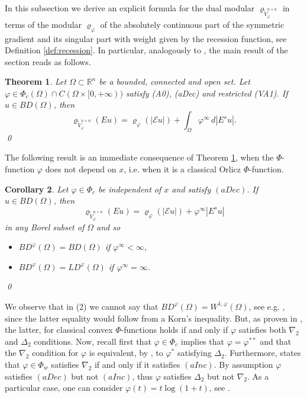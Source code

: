 \documentclass[a4paper,11pt,oneside,notitlepage]{article}
\newtheorem{theorem}{Theorem}[section]
\newtheorem{corollary}[theorem]{Corollary}
\numberwithin{equation}{section}
\def\R{\mathbb{R}}
\newcommand{\vphi}{\varphi}
\newcommand{\vrho}{\varrho}
\newcommand{\E}{\mathcal{E}}
\begin{document}
In this subsection we derive an explicit formula for the dual modular $\vrho_{\widetilde{V}^{n \times n}_\vphi}$ in terms of the modular $\vrho_\vphi$ of the absolutely continuous part of the symmetric gradient and its singular part with weight given by the recession function, see Definition \ref{def:recession}. In particular, analogously to \cite[Theorem 6.4]{EHH}, the main result of the section reads as follows.

\begin{theorem}
\label{thm:exactFormula}
    Let $\Omega \subset \R^n$ be a bounded, connected and open set. Let $\vphi \in \Phi_c(\Omega) \cap C(\Omega \times [0,+\infty))$ satisfy (A0), (aDec) and restricted (VA1). If $u \in BD(\Omega)$, then 
    \begin{equation*}
        \vrho_{\widetilde{V}^{n \times n}_\vphi}(Eu) = \vrho_\vphi(|\E u|) + \int_\Omega \vphi^\infty \, d|E^su|.
    \end{equation*}
    \qed
\end{theorem}


The following result is an immediate consequence of Theorem \ref{thm:exactFormula}, when the $\Phi$-function $\vphi$ does not depend on $x$, i.e. when it is a classical Orlicz $\Phi$-function.

\begin{corollary}
\label{ascor6.5EHH}
    Let $\vphi \in \Phi_c$ be independent of $x$ and satisfy $(aDec)$. If $u \in BD(\Omega)$, then
    \begin{equation*}
        \vrho_{\widetilde{V}^{n \times n}_\vphi}(Eu) = \vrho_\vphi(|\E u|) + \vphi^\infty |E^su|
    \end{equation*}
    in any Borel subset of $\Omega$ and so
    \begin{itemize}
        \item[(1)] $BD^\vphi(\Omega) = BD(\Omega)$ if $\vphi^\infty < \infty$,
        \item[(2)] $BD^\vphi(\Omega) = LD^\vphi(\Omega)$ if $\vphi^\infty = \infty$.
    \end{itemize}
    \qed
\end{corollary}

We observe that in (2) we cannot say that $BD^\vphi(\Omega) = W^{1,\vphi}(\Omega)$, see e.g. \cite[Definition 3]{BHH18}, since the latter equality would follow from a Korn's inequality. But, as proven in \cite[Theorem 1.1]{BD12}, the latter, for classical convex $\Phi$-functions holds if and only if $\vphi$ satisfies both $\nabla_2$ and $\Delta_2$ conditions. Now, recall first that $\vphi \in \Phi_c$ implies that $\vphi= \vphi^{**}$ and that the $\nabla_2$ condition for $\vphi$ is equivalent, by \cite[Definition 2.4.10]{HHbook}, to $\vphi^*$ satisfying $\Delta_2$. Furthermore, \cite[Corollary 2.4.11]{HHbook} states that $\vphi \in \Phi_w$ satisfies $\nabla_2$ if and only if it satisfies $(aInc)$.  By assumption $\vphi$ satisfies $(aDec)$ but not $(aInc)$, thus $\vphi$ satisfies $\Delta_2$ but not $\nabla_2$. As a particular case, one can consider $\vphi(t) = t \log(1+t)$, see \cite[Remark 1.3]{HHbook}.
\end{document}
